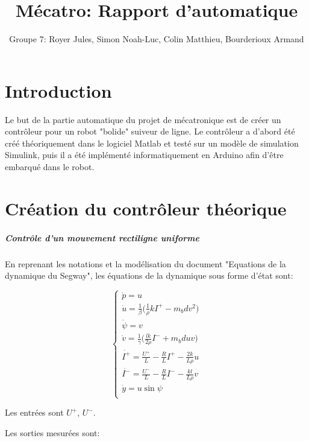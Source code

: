 \documentclass{report}
\title{Mécatro: Rapport d'automatique}
\author{Groupe 7: Royer Jules, Simon Noah-Luc, Colin Matthieu, Bourderioux Armand}
\date{}
\begin{document}
\maketitle

\tableofcontents

\chapter{Introduction}
Le but de la partie automatique du projet de mécatronique est de créer un contrôleur
pour un robot "bolide" suiveur de ligne. Le contrôleur a d'abord été créé théoriquement
dans le logiciel Matlab et testé sur un modèle de simulation Simulink, puis il a été
implémenté informatiquement en Arduino afin d'être embarqué dans le robot.

\chapter{Création du contrôleur théorique}

\paragraph{Contrôle d'un mouvement rectiligne uniforme}

En reprenant les notations et la modélisation du document "Equations de la dynamique du Segway",
les équations de la dynamique sous forme d'état sont:

\begin{equation*}
    \begin{cases}
        \dot{p} = u \\
        \dot{u} = \frac{1}{\beta}\big( \frac{1}{\rho}kI^{+} - m_bdv^2 \big) \\
        \dot{\psi} = v \\
        \dot{v} = \frac{1}{\gamma}\big( \frac{lk}{2\rho}I^{-} + m_bduv \big) \\
        \dot{I^{+}} = \frac{U^{+}}{L} - \frac{R}{L}I^{+} - \frac{2k}{L\rho}u \\
        \dot{I^{-}} = \frac{U^{-}}{L} - \frac{R}{L}I^{-} - \frac{kl}{L\rho}v \\
        \dot{y} = u\sin\psi \\
    \end{cases}
\end{equation*}

Les entrées sont $U^{+}$, $U^{-}$.

Les sorties mesurées sont:
\end{document}
